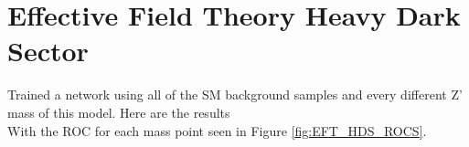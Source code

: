 \documentclass[12pt, a4paper]{book}
\begin{document}
\clearpage
\section{Effective Field Theory Heavy Dark Sector}Trained a network using all of the SM background samples and every different Z' mass of this model. Here are the results
\\With the ROC for each mass point seen in Figure \ref{fig:EFT_HDS_ROCS}.
\end{document}
